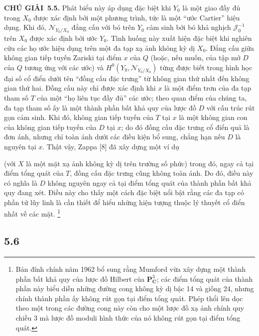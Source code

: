 \documentclass[11pt,twoside,openany]{book}
\numberwithin{equation}{section}
\newcommand{\src}[1]{%
  \phantomsection\hypertarget{src:\fgasourceid:#1}{}%
  \marginpar{\raggedleft\footnotesize\sffamily #1}%
}
\newcommand{\fgasourceid}{unset}
\newcommand{\result}[2]{\par\medskip\noindent\textbf{#1\if\relax\detokenize{#2}\relax\else\ #2\fi.}\quad}
\begin{document}
\result{CHÚ GIẢI}{5.5} Phát biểu này áp dụng đặc biệt khi $Y_0$ là một giao
đầy đủ trong $X_0$ được xác định bởi một phương trình, tức là một ``ước
Cartier'' hiệu dụng. Khi đó, $\mathcal N_{Y_0/X_0}$ đẳng cấu với bó trên $Y_0$
cảm sinh bởi bó khả nghịch $\mathcal J_0^{-1}$ trên $X_0$ được xác định bởi
ước $Y_0$. Tình huống này xuất hiện đặc biệt khi nghiên cứu các họ ước hiệu
dụng trên một đa tạp xạ ảnh không kỳ dị $X_0$. Đẳng cấu giữa không gian tiếp
tuyến Zariski tại điểm $x$ của $Q$ (hoặc, nếu muốn, của tập mở $D$ của $Q$
tương ứng với các ước) và $H^0(Y_0,\mathcal N_{Y_0/X_0})$ từng được biết trong
hình học đại số cổ điển dưới tên ``đồng cấu đặc trưng'' từ không gian thứ nhất
đến không gian thứ hai. Đồng cấu này chỉ được xác định khi $x$ là một điểm trơn
của đa tạp tham số $T$ của một ``họ liên tục đầy đủ'' các ước; theo quan điểm
của chúng ta, đa tạp tham số ấy là một thành phần bất khả quy của lược đồ $D$
với cấu trúc rút gọn cảm sinh. Khi đó, không gian tiếp tuyến của $T$ tại $x$ là
một không gian con của không gian tiếp tuyến của $D$ tại $x$; do đó đồng cấu
đặc trưng cổ điển quả là đơn ánh, nhưng chỉ toàn ánh dưới các điều kiện bổ
sung, chẳng hạn nếu $D$ là nguyên tại $x$. Thật vậy, Zappa [8] đã xây dựng
một ví dụ
\src{272}
(với $X$ là một mặt xạ ảnh không kỳ dị trên trường số phức) trong đó, ngay cả
tại điểm tổng quát của $T$, đồng cấu đặc trưng cũng không toàn ánh. Do đó, điều
này có nghĩa là $D$ không nguyên ngay cả tại điểm tổng quát của thành phần bất
khả quy đang xét. Điều này cho thấy một cách đặc biệt nổi bật rằng các đa tạp
có phần tử lũy linh là cần thiết để hiểu những hiện tượng thuộc lý thuyết cổ
điển nhất về các mặt.
\footnote{Bản đính chính năm 1962 bổ sung rằng Mumford vừa xây dựng một thành
phần bất khả quy của lược đồ Hilbert của $\mathbf P^3_{\mathbf C}$; các điểm
tổng quát của thành phần này biểu diễn những đường cong không kỳ dị bậc 14 và
giống 24, nhưng chính thành phần ấy không rút gọn tại điểm tổng quát. Phép
thổi lên dọc theo một trong các đường cong này còn cho một lược đồ xạ ảnh chính
quy chiều 3 mà lược đồ moduli hình thức của nó không rút gọn tại điểm tổng
quát.}

\subsection*{5.6}
\end{document}
